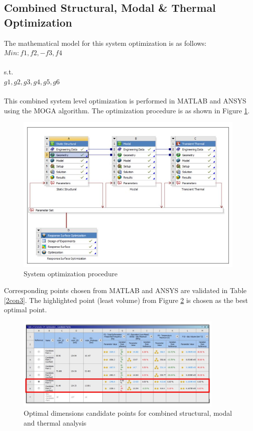 \documentclass[12pt]{article}
\begin{document}
 \subsection{Combined Structural, Modal \& Thermal Optimization}
The mathematical model for this system optimization is as follows:\newline\newline
$Min: f1, f2, -f3,f4$\\\\
s.t.\\  $g1, g2, g3, g4, g5, g6$ \\\\
This combined system level optimization is performed in MATLAB and ANSYS using the MOGA algorithm. The optimization procedure is as shown in Figure \ref{doe_all}. 
\begin{figure}[H]
\begin{center}
\includegraphics[width=1\textwidth]{doe_all.jpg}
\caption{System optimization procedure}
\label{doe_all}
\end{center}
\end{figure}
Corresponding points chosen from MATLAB and ANSYS are validated in Table \ref{2con3}. The highlighted point (least volume) from Figure \ref{global} is chosen as the best optimal point.
\begin{figure}[H]
\begin{center}
\includegraphics[width=0.9\textwidth]{mg.jpg}
\caption{Optimal dimensions candidate points for combined structural, modal and thermal analysis}
\label{global}
\end{center}
\end{figure}
\end{document}
